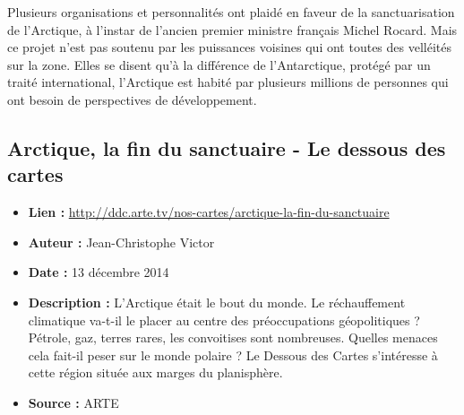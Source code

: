 \documentclass[8pt]{article}
\begin{document}
Plusieurs organisations et personnalités ont plaidé en faveur de la sanctuarisation de l’Arctique, à l’instar de l’ancien premier ministre français Michel Rocard. Mais ce projet n’est pas soutenu par les puissances voisines qui ont toutes des velléités sur la zone. Elles se disent qu’à la différence de l’Antarctique, protégé par un traité international, l’Arctique est habité par plusieurs millions de personnes qui ont besoin de perspectives de développement.

\begin{center}
\end{center}

\subsection{Arctique, la fin du sanctuaire - Le dessous des cartes}

\begin{itemize}
	\item \textbf{Lien : }  \url{http://ddc.arte.tv/nos-cartes/arctique-la-fin-du-sanctuaire} 
	\item \textbf{Auteur : }  Jean-Christophe Victor
	\item \textbf{Date : } 13 décembre 2014
	\item \textbf{Description : } L’Arctique était le bout du monde. Le réchauffement climatique va-t-il le placer au centre des préoccupations géopolitiques ? Pétrole, gaz, terres rares, les convoitises sont nombreuses. Quelles menaces cela fait-il peser sur le monde polaire ? Le Dessous des Cartes s’intéresse à cette région située aux marges du planisphère.
	\item \textbf{Source : } ARTE
\end{itemize}
\end{document}
